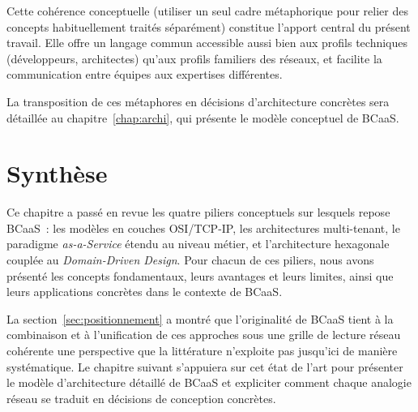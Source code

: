 Cette cohérence conceptuelle (utiliser un seul cadre métaphorique pour relier des
concepts habituellement traités séparément) constitue l'apport central du présent
travail. Elle offre un langage commun accessible aussi bien aux profils techniques
(développeurs, architectes) qu'aux profils familiers des réseaux, et facilite la
communication entre équipes aux expertises différentes.

La transposition de ces métaphores en décisions d'architecture concrètes sera détaillée au
chapitre~\ref{chap:archi}, qui présente le modèle conceptuel de BCaaS.

\section*{Synthèse}
\label{sec:conclusion-chap2}

Ce chapitre a passé en revue les quatre piliers conceptuels sur lesquels repose BCaaS~:
les modèles en couches OSI/TCP-IP, les architectures multi-tenant, le paradigme
\textit{as-a-Service} étendu au niveau métier, et l'architecture hexagonale couplée au
\textit{Domain-Driven Design}. Pour chacun de ces piliers, nous avons présenté les
concepts fondamentaux, leurs avantages et leurs limites, ainsi que leurs applications
concrètes dans le contexte de BCaaS.

La section~\ref{sec:positionnement} a montré que l'originalité de BCaaS tient à la
combinaison et à l'unification de ces approches sous une grille de lecture réseau
cohérente une perspective que la littérature n'exploite pas jusqu'ici de manière
systématique. Le chapitre suivant s'appuiera sur cet état de l'art pour présenter le
modèle d'architecture détaillé de BCaaS et expliciter comment chaque analogie réseau se
traduit en décisions de conception concrètes.